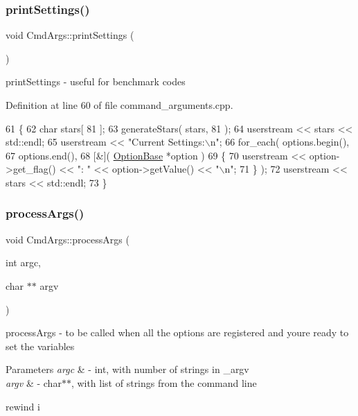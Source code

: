 \subsubsection{\texorpdfstring{print\+Settings()}{printSettings()}}
{\footnotesize\ttfamily void Cmd\+Args\+::print\+Settings (\begin{DoxyParamCaption}{ }\end{DoxyParamCaption})}

print\+Settings -\/ useful for benchmark codes 

Definition at line 60 of file command\+\_\+arguments.\+cpp.


\begin{DoxyCode}
61 \{
62    \textcolor{keywordtype}{char} stars[ 81 ];
63    generateStars( stars, 81 );
64    userstream << stars << std::endl;
65    userstream << \textcolor{stringliteral}{"Current Settings:\(\backslash\)n"};
66    for\_each( options.begin(),
67              options.end(),
68              [&]( \hyperlink{class_option_base}{OptionBase} *option )
69              \{
70                userstream << option->get\_flag() << \textcolor{stringliteral}{":    "} << option->getValue() << \textcolor{stringliteral}{"\(\backslash\)n"};
71              \} );
72    userstream << stars << std::endl;
73 \}
\end{DoxyCode}
\hypertarget{class_cmd_args_a91066e5757db5cee24b244a736365939}{}\label{class_cmd_args_a91066e5757db5cee24b244a736365939} 
\subsubsection{\texorpdfstring{process\+Args()}{processArgs()}}
{\footnotesize\ttfamily void Cmd\+Args\+::process\+Args (\begin{DoxyParamCaption}\item[{int}]{argc,  }\item[{char $\ast$$\ast$}]{argv }\end{DoxyParamCaption})}

process\+Args -\/ to be called when all the options are registered and you\textquotesingle{}re ready to set the variables 
\begin{DoxyParams}{Parameters}
{\em argc} & -\/ int, with number of strings in \+\_\+argv \\
\hline
{\em argv} & -\/ char$\ast$$\ast$, with list of strings from the command line \\
\hline
\end{DoxyParams}
rewind i 

